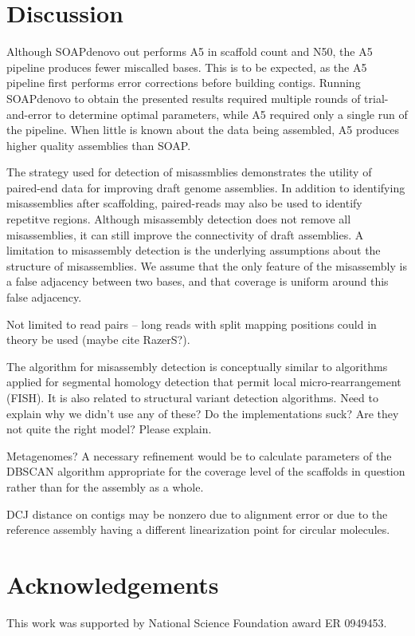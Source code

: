 \documentclass{bioinfo}
\begin{document}
\section{Discussion}

Although SOAPdenovo out performs A5 in scaffold count and N50, the A5 pipeline produces fewer miscalled bases. This is to
be expected, as the A5 pipeline first performs error corrections before building contigs. Running SOAPdenovo to
obtain the presented results required multiple rounds of trial-and-error to determine optimal parameters, while A5 required
only a single run of the pipeline. When little is known about the data being assembled, A5 produces higher quality assemblies 
than SOAP.

The strategy used for detection of misassmblies demonstrates the utility of paired-end data for improving draft genome assemblies.
In addition to identifying misassemblies after scaffolding, paired-reads may also be used to identify repetitve regions.   
Although misassembly detection does not remove all misassemblies, it can still improve the connectivity of draft assemblies.
A limitation to misassembly detection is the underlying assumptions about the structure of misassemblies. We assume that the only
feature of the misassembly is a false adjacency between two bases, and that coverage is uniform around this false adjacency. 

Not limited to read pairs -- long reads with split mapping positions could in theory be used (maybe cite RazerS?).

The algorithm for misassembly detection is conceptually similar to algorithms applied for segmental homology detection that permit local micro-rearrangement (FISH). It is also related to structural variant detection algorithms. Need to explain why we didn't use any of these?  Do the implementations suck? Are they not quite the right model? Please explain.


Metagenomes? A necessary refinement would be to calculate parameters of the DBSCAN algorithm appropriate for the coverage level of the 
scaffolds in question rather than for the assembly as a whole.

DCJ distance on contigs may be nonzero due to alignment error or due to the reference assembly having a different linearization point
for circular molecules. 

\section*{Acknowledgements}
This work was supported by National Science Foundation award ER 0949453.
\end{document}
